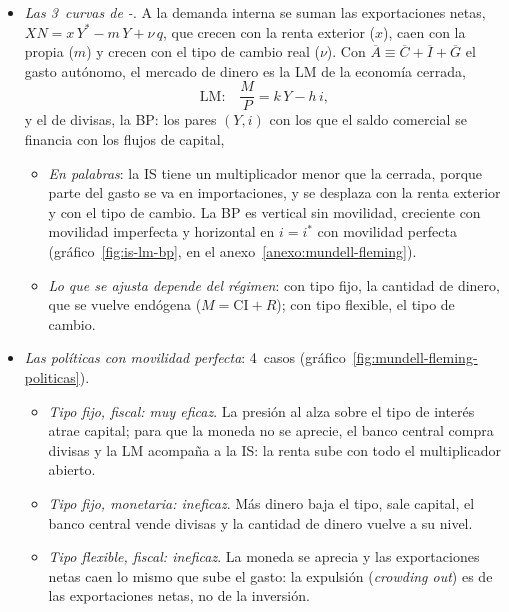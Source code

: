 \documentclass[11pt]{article}
\begin{document}
\begin{itemize}
\item \emph{Las 3~curvas de -}. A la demanda interna se suman las exportaciones netas, $XN=x\,Y^*-m\,Y+\nu\,q$, que crecen con la renta exterior ($x$), caen con la propia ($m$) y crecen con el tipo de cambio real ($\nu$). Con $\overline{A}\equiv\overline{C}+\overline{I}+\overline{G}$ el gasto autónomo,
  el mercado de dinero es la LM de la economía cerrada,
  \begin{equation}
  \text{LM:}\quad \frac{M}{P}=k\,Y-h\,i , \label{eq:lm}
  \end{equation}
  y el de divisas, la BP: los pares $(Y,i)$ con los que el saldo comercial se financia con los flujos de capital,
  \begin{itemize}
  \item \emph{En palabras}: la IS tiene un multiplicador menor que la cerrada, porque parte del gasto se va en importaciones, y se desplaza con la renta exterior y con el tipo de cambio. La BP es vertical sin movilidad, creciente con movilidad imperfecta y horizontal en $i=i^*$ con movilidad perfecta (gráfico~\ref{fig:is-lm-bp}, en el anexo~\ref{anexo:mundell-fleming}).
  \item \emph{Lo que se ajusta depende del régimen}: con tipo fijo, la cantidad de dinero, que se vuelve endógena ($M=\mathrm{CI}+R$); con tipo flexible, el tipo de cambio.
  \end{itemize}
\item \emph{Las políticas con movilidad perfecta}: 4~casos (gráfico~\ref{fig:mundell-fleming-politicas}).
  \begin{itemize}
  \item \emph{Tipo fijo, fiscal: muy eficaz}. La presión al alza sobre el tipo de interés atrae capital; para que la moneda no se aprecie, el banco central compra divisas y la LM acompaña a la IS: la renta sube con todo el multiplicador abierto.
  \item \emph{Tipo fijo, monetaria: ineficaz}. Más dinero baja el tipo, sale capital, el banco central vende divisas y la cantidad de dinero vuelve a su nivel.
  \item \emph{Tipo flexible, fiscal: ineficaz}. La moneda se aprecia y las exportaciones netas caen lo mismo que sube el gasto: la expulsión (\emph{crowding out}) es de las exportaciones netas, no de la inversión.

\end{itemize}
\end{itemize}
\end{document}
